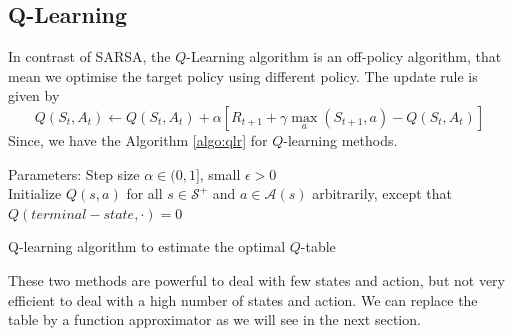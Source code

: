\subsection{Q-Learning}
In contrast of SARSA, the $Q$-Learning algorithm is an off-policy algorithm, that mean we optimise the target policy using different policy. The update rule is given by
\begin{equation}\label{eq:qlr}
	Q(S_t, A_t)\leftarrow Q(S_t, A_t) + \alpha[R_{t+1} + \gamma\max_a (S_{t+1}, a) - Q(S_t, A_t)]
\end{equation}
Since, we have the Algorithm \ref{algo:qlr} for $Q$-learning methods.
\begin{algorithm}
	Parameters: Step size $\alpha\in(0,1]$, small $\epsilon>0$\\
	Initialize $Q(s,a)$ for all $s\in\mathcal{S}^{+}$ and $a\in\mathcal{A}(s)$ arbitrarily, except that $Q(terminal-state, \cdot)=0$\\
	\caption{Q-learning algorithm to estimate the optimal $Q$-table}
	\label{algo:qlr}
\end{algorithm}



These two methods are powerful to deal with few states and action, but not very efficient to deal with a high number of states and action. We can replace the table by a function approximator as we will see in the next section.



